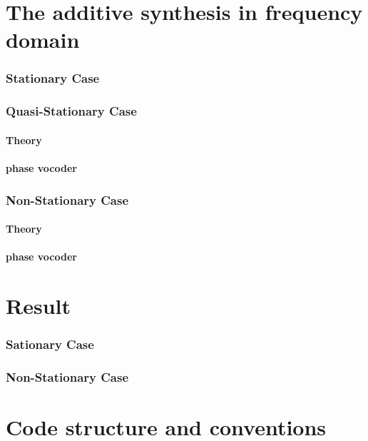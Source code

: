 \documentclass[]{article}
\begin{document}
\newpage
\part{The additive synthesis in frequency domain}

\section{Stationary Case}\label{stationary-case}
\section{Quasi-Stationary Case}\label{quasi-stationary-case}
\subsection{Theory}\label{theory-quasi-stat}
\subsection{phase vocoder}\label{phase-vocoder-quasi-stationary}
\section{Non-Stationary Case}\label{non-stationary-case}
\subsection{Theory}\label{theory-non-stat}
\subsection{phase vocoder}\label{phase-vocoder-stationary}

\newpage
\part{Result}
\section{Sationary Case}\label{sec:sationary-results}
\section{Non-Stationary Case}\label{non-stationary-results}

\newpage
\part{Code structure and conventions}\label{sec:code-structure-and-conventions}
\end{document}
